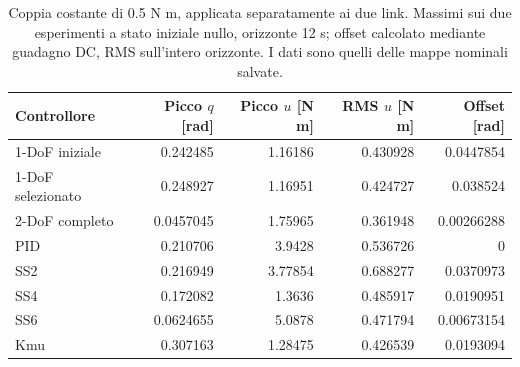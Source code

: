 \begin{table}[H]\centering\small
\begin{tabular}{lrrrr}\toprule
Controllore & Picco $q$ [rad] & Picco $u$ [N m] & RMS $u$ [N m] & Offset [rad]\\\midrule
1-DoF iniziale & 0.242485 & 1.16186 & 0.430928 & 0.0447854 \\
1-DoF selezionato & 0.248927 & 1.16951 & 0.424727 & 0.038524 \\
2-DoF completo & 0.0457045 & 1.75965 & 0.361948 & 0.00266288 \\
PID & 0.210706 & 3.9428 & 0.536726 & 0 \\
SS2 & 0.216949 & 3.77854 & 0.688277 & 0.0370973 \\
SS4 & 0.172082 & 1.3636 & 0.485917 & 0.0190951 \\
SS6 & 0.0624655 & 5.0878 & 0.471794 & 0.00673154 \\
Kmu & 0.307163 & 1.28475 & 0.426539 & 0.0193094 \\
\bottomrule\end{tabular}
\caption{Coppia costante di 0.5 N m, applicata separatamente ai due link.
Massimi sui due esperimenti a stato iniziale nullo, orizzonte 12 s;
offset calcolato mediante guadagno DC, RMS sull'intero orizzonte.
I dati sono quelli delle mappe nominali salvate.}
\end{table}
